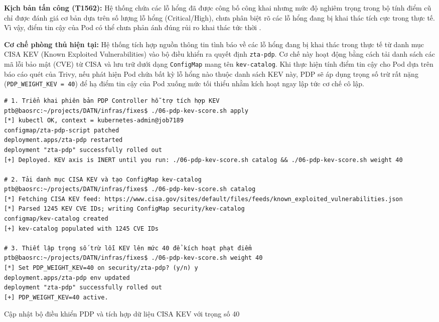 \textbf{Kịch bản tấn công (T1562):} Hệ thống chứa các lỗ hổng đã được công bố công khai nhưng mức độ nghiêm trọng trong bộ tính điểm cũ chỉ được đánh giá cơ bản dựa trên số lượng lỗ hổng (Critical/High), chưa phân biệt rõ các lỗ hổng đang bị khai thác tích cực trong thực tế. Vì vậy, điểm tin cậy của Pod có thể chưa phản ánh đúng rủi ro khai thác tức thời \parencite{mitre_t1562}.

\textbf{Cơ chế phòng thủ hiện tại:} Hệ thống tích hợp nguồn thông tin tình báo về các lỗ hổng đang bị khai thác trong thực tế từ danh mục CISA KEV (Known Exploited Vulnerabilities) vào bộ điều khiển ra quyết định \texttt{zta-pdp}. Cơ chế này hoạt động bằng cách tải danh sách các mã lỗi bảo mật (CVE) từ CISA và lưu trữ dưới dạng \texttt{ConfigMap} mang tên \texttt{kev-catalog}. Khi thực hiện tính điểm tin cậy cho Pod dựa trên báo cáo quét của Trivy, nếu phát hiện Pod chứa bất kỳ lỗ hổng nào thuộc danh sách KEV này, PDP sẽ áp dụng trọng số trừ rất nặng (\texttt{PDP\_WEIGHT\_KEV = 40}) để hạ điểm tin cậy của Pod xuống mức tối thiểu nhằm kích hoạt ngay lập tức cơ chế cô lập.

\begin{listing}[H]
\begin{verbatim}
# 1. Triển khai phiên bản PDP Controller hỗ trợ tích hợp KEV
ptb@baosrc:~/projects/DATN/infras/fixes$ ./06-pdp-kev-score.sh apply
[*] kubectl OK, context = kubernetes-admin@job7189
configmap/zta-pdp-script patched
deployment.apps/zta-pdp restarted
deployment "zta-pdp" successfully rolled out
[+] Deployed. KEV axis is INERT until you run: ./06-pdp-kev-score.sh catalog && ./06-pdp-kev-score.sh weight 40

# 2. Tải danh mục CISA KEV và tạo ConfigMap kev-catalog
ptb@baosrc:~/projects/DATN/infras/fixes$ ./06-pdp-kev-score.sh catalog
[*] Fetching CISA KEV feed: https://www.cisa.gov/sites/default/files/feeds/known_exploited_vulnerabilities.json
[*] Parsed 1245 KEV CVE IDs; writing ConfigMap security/kev-catalog
configmap/kev-catalog created
[+] kev-catalog populated with 1245 CVE IDs

# 3. Thiết lập trọng số trừ lỗi KEV lên mức 40 để kích hoạt phạt điểm
ptb@baosrc:~/projects/DATN/infras/fixes$ ./06-pdp-kev-score.sh weight 40
[*] Set PDP_WEIGHT_KEV=40 on security/zta-pdp? (y/n) y
deployment.apps/zta-pdp env updated
deployment "zta-pdp" successfully rolled out
[+] PDP_WEIGHT_KEV=40 active.
\end{verbatim}
\caption{Cập nhật bộ điều khiển PDP và tích hợp dữ liệu CISA KEV với trọng số 40}
\label{lst:c3_kb13}
\end{listing}

